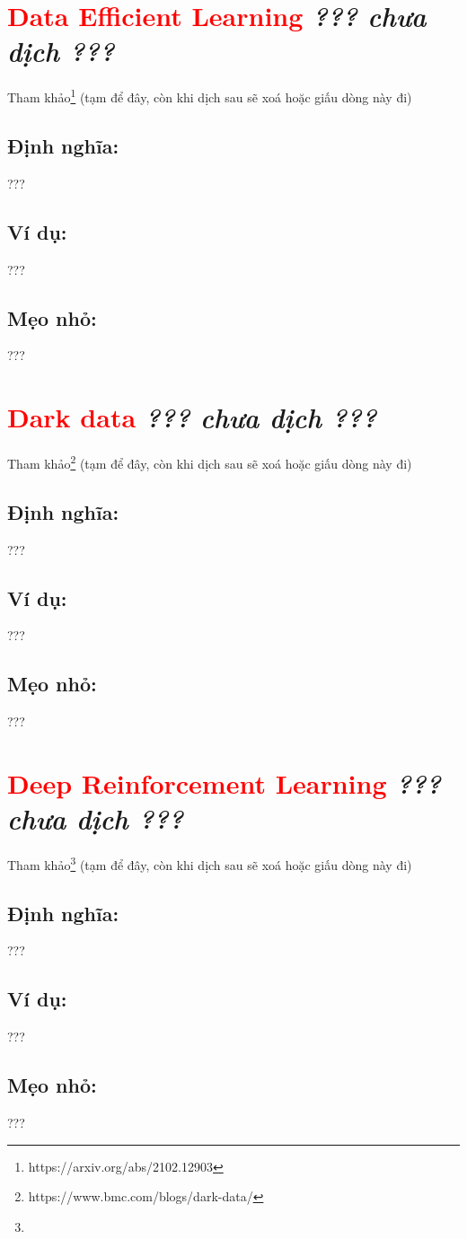 \section*{\huge \textcolor{Red}{Data Efficient Learning}  \small \textit{??? chưa dịch ???} }
Tham khảo\footnote{https://arxiv.org/abs/2102.12903} (tạm để đây, còn khi dịch sau sẽ xoá hoặc giấu dòng này đi)
\subsection*{Định nghĩa:}
???
\subsection*{Ví dụ:}
???
\subsection*{Mẹo nhỏ:}
???
\section*{\huge \textcolor{Red}{Dark data}  \small \textit{??? chưa dịch ???} }
Tham khảo\footnote{https://www.bmc.com/blogs/dark-data/} (tạm để đây, còn khi dịch sau sẽ xoá hoặc giấu dòng này đi)
\subsection*{Định nghĩa:}
???
\subsection*{Ví dụ:}
???
\subsection*{Mẹo nhỏ:}
???
\section*{\huge \textcolor{Red}{Deep Reinforcement Learning}  \small \textit{??? chưa dịch ???} }
Tham khảo\footnote{} (tạm để đây, còn khi dịch sau sẽ xoá hoặc giấu dòng này đi)
\subsection*{Định nghĩa:}
???
\subsection*{Ví dụ:}
???
\subsection*{Mẹo nhỏ:}
???
